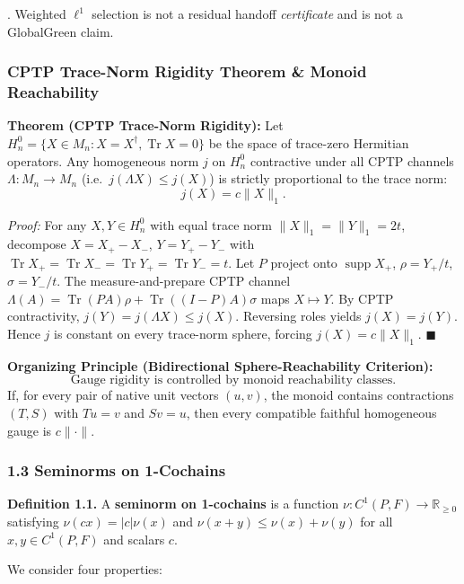\documentclass[
  11pt,
]{article}
\renewenvironment{quote}
  {\begin{leftbar}\small}
  {\end{leftbar}}
\begin{document}
. Weighted \(\ell^1\) selection is not a residual handoff \emph{certificate} and is not a GlobalGreen claim.

\subsubsection{CPTP Trace-Norm Rigidity Theorem \& Monoid Reachability}\label{cptp-trace-norm-rigidity-theorem-monoid-reachability}

\begin{quote}
\textbf{Theorem (CPTP Trace-Norm Rigidity):} Let \(H_n^0 = \{X \in M_n : X = X^\dagger, \operatorname{Tr}X = 0\}\) be the space of trace-zero Hermitian operators. Any homogeneous norm \(j\) on \(H_n^0\) contractive under all CPTP channels \(\Lambda : M_n \to M_n\) (i.e.~\(j(\Lambda X) \le j(X)\)) is strictly proportional to the trace norm:
\[j(X) = c \|X\|_1.\]

\emph{Proof:} For any \(X, Y \in H_n^0\) with equal trace norm \(\|X\|_1 = \|Y\|_1 = 2t\), decompose \(X = X_+ - X_-\), \(Y = Y_+ - Y_-\) with \(\operatorname{Tr}X_+ = \operatorname{Tr}X_- = \operatorname{Tr}Y_+ = \operatorname{Tr}Y_- = t\). Let \(P\) project onto \(\operatorname{supp}X_+\), \(\rho = Y_+/t\), \(\sigma = Y_-/t\). The measure-and-prepare CPTP channel \(\Lambda(A) = \operatorname{Tr}(PA)\rho + \operatorname{Tr}((I-P)A)\sigma\) maps \(X \mapsto Y\). By CPTP contractivity, \(j(Y) = j(\Lambda X) \le j(X)\). Reversing roles yields \(j(X) = j(Y)\). Hence \(j\) is constant on every trace-norm sphere, forcing \(j(X) = c\|X\|_1\). \(\blacksquare\)
\end{quote}

\begin{quote}
\textbf{Organizing Principle (Bidirectional Sphere-Reachability Criterion):}
\[\boxed{\text{Gauge rigidity is controlled by monoid reachability classes.}}\]
If, for every pair of native unit vectors \((u,v)\), the monoid contains contractions \((T,S)\) with \(Tu=v\) and \(Sv=u\), then every compatible faithful homogeneous gauge is \(c\|\cdot\|\).

\subsubsection{1.3 Seminorms on 1-Cochains}\label{seminorms-on-1-cochains}
\end{quote}

\begin{quote}
\textbf{Definition 1.1.} A \textbf{seminorm on 1-cochains} is a function \(\nu: C^1(P, F) \to \mathbb{R}_{\geq 0}\) satisfying \(\nu(cx) = |c|\nu(x)\) and \(\nu(x+y) \leq \nu(x) + \nu(y)\) for all \(x,y \in C^1(P, F)\) and scalars \(c\).

We consider four properties:
\end{quote}
\end{document}

